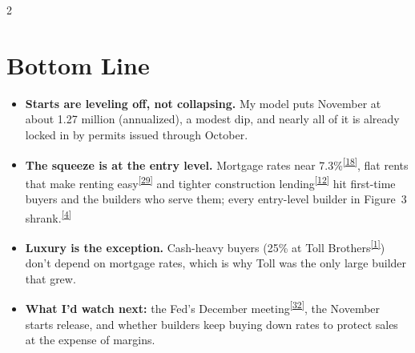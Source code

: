 \documentclass[10pt]{article}
\DeclareRobustCommand{\srcnum}[1]{\textsuperscript{\hyperlink{src#1}{[#1]}}}
\begin{document}
\begin{multicols}{2}
\section{Bottom Line}
\begin{itemize}
\item \textbf{Starts are leveling off, not collapsing.} My model puts November at about 1.27 million (annualized), a modest dip, and nearly all of it is already locked in by permits issued through October.
\item \textbf{The squeeze is at the entry level.} Mortgage rates near 7.3\%\srcnum{18}, flat rents that make renting easy\srcnum{29} and tighter construction lending\srcnum{12} hit first-time buyers and the builders who serve them; every entry-level builder in Figure~3 shrank.\srcnum{4}
\item \textbf{Luxury is the exception.} Cash-heavy buyers (25\% at Toll Brothers\srcnum{1}) don't depend on mortgage rates, which is why Toll was the only large builder that grew.
\item \textbf{What I'd watch next:} the Fed's December meeting\srcnum{32}, the November starts release, and whether builders keep buying down rates to protect sales at the expense of margins.
\end{itemize}


\end{multicols}
\end{document}
